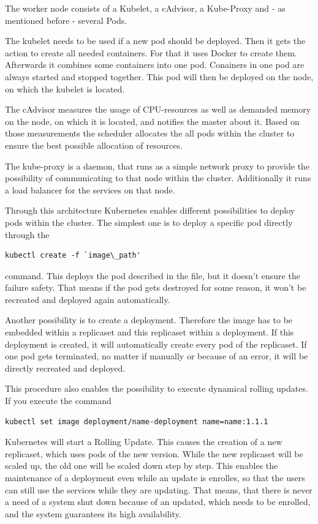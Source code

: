 The worker node consists of a Kubelet, a cAdvisor, a Kube-Proxy and - as mentioned before - several Pods. 

The kubelet needs to be used if a new pod should be deployed. Then it gets the action to create all needed containers. For that it uses Docker to create them. Afterwards it combines some containers into one pod. Conainers in one pod are always started and stopped together. This pod will then be deployed on the node, on which the kubelet is located.

The cAdvisor measures the usage of CPU-resources as well as demanded memory on the node, on which it is located, and notifies the master about it. Based on those measurements the scheduler allocates the all pods within the cluster to ensure the best possible allocation of resources.

The kube-proxy is a daemon, that runs as a simple network proxy to provide the possibility of communicating to that node within the cluster. Additionally it runs a load balancer for the services on that node.

Through this architecture Kubernetes enables different possibilities to deploy pods within the cluster. The simplest one is to deploy a specific pod directly through the 
\begin{lstlisting}[caption={Create Kubernetes pod},captionpos=b]
kubectl create -f `image\_path'
\end{lstlisting}
command. This deploys the pod described in the file, but it doesn't ensure the failure safety. That means if the pod gets destroyed for some reason, it won't be recreated and deployed again automatically. 


Another possibility is to create a deployment. Therefore the image has to be embedded within a replicaset and this replicaset within a deployment. If this deployment is created, it will automatically create every pod of the replicaset. If one pod gets terminated, no matter if manually or because of an error, it will be directly recreated and deployed.

This procedure also enables the possibility to execute dynamical rolling updates. If you execute the command
\begin{lstlisting}[caption={Create Kubernetes deployment},captionpos=b]
kubectl set image deployment/name-deployment name=name:1.1.1
\end{lstlisting}
Kubernetes will start a Rolling Update. This causes the creation of a new replicaset, which uses pods of the new version. While the new replicaset will be scaled up, the old one will be scaled down step by step. This enables the maintenance of a deployment even while an update is enrolles, so that the users can still use the services while they are updating. That means, that there is never a need of a system shut down because of an updated, which needs to be enrolled, and the system guarantees its high availability.

